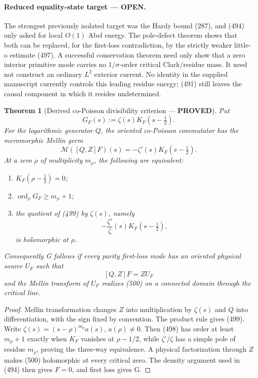 \documentclass[11pt]{article}
\newtheorem{theorem}{Theorem}
\newcommand{\PROVED}{\textcolor{green!45!black}{\textbf{PROVED}}}
\newcommand{\OPEN}{\textcolor{red!70!black}{\textbf{OPEN}}}
\begin{document}
\paragraph{Reduced equality-state target --- \OPEN.}
The strongest previously isolated target was the Hardy bound (287), and
(494) only asked for local \(O(1)\) Abel energy.  The pole-defect theorem
shows that both can be replaced, for the first-loss contradiction, by the
strictly weaker little-o estimate (497).  A successful conservation theorem
need only show that a zero interior primitive mode carries no
\(1/\sigma\)-order critical Clark/residue mass.  It need not construct an
ordinary \(L^2\) exterior current.  No identity in the supplied manuscript
currently controls this leading residue energy; (491) still leaves the
causal component in which it resides undetermined.

\begin{theorem}[Derived co-Poisson divisibility criterion --- \PROVED]
Put
\begin{equation}
 G_F(s):=\zeta(s)K_F(s-\tfrac12).                    \tag{498}
\end{equation}
For the logarithmic generator \(Q\), the oriented co-Poisson commutator has
the meromorphic Mellin germ
\begin{equation}
 \mathcal M([Q,Z]F)(s)=-\zeta'(s)K_F(s-\tfrac12).    \tag{499}
\end{equation}
At a zero \(\rho\) of multiplicity \(m_\rho\), the following are
equivalent:
\begin{enumerate}
\item \(K_F(\rho-\tfrac12)=0\);
\item \(\operatorname{ord}_\rho G_F\ge m_\rho+1\);
\item the quotient of (499) by \(\zeta(s)\), namely
\begin{equation}
 -\frac{\zeta'}{\zeta}(s)K_F(s-\tfrac12),            \tag{500}
\end{equation}
is holomorphic at \(\rho\).
\end{enumerate}
Consequently G follows if every parity first-loss mode has an oriented
physical source \(U_F\) such that
\[
 [Q,Z]F=ZU_F
\]
and the Mellin transform of \(U_F\) realizes (500) on a connected domain
through the critical line.
\end{theorem}

\begin{proof}
Mellin transformation changes \(Z\) into multiplication by \(\zeta(s)\)
and \(Q\) into differentiation, with the sign fixed by convention.  The
product rule gives (499).  Write
\(\zeta(s)=(s-\rho)^{m_\rho}a(s)\), \(a(\rho)\ne0\).
Then (498) has order at least \(m_\rho+1\) exactly when \(K_F\) vanishes at
\(\rho-1/2\), while \(\zeta'/\zeta\) has a simple pole of residue
\(m_\rho\), proving the three-way equivalence.  A physical factorization
through \(Z\) makes (500) holomorphic at every critical zero.  The density
argument used in (494) then gives \(F=0\), and first loss gives G.
\end{proof}
\end{document}
